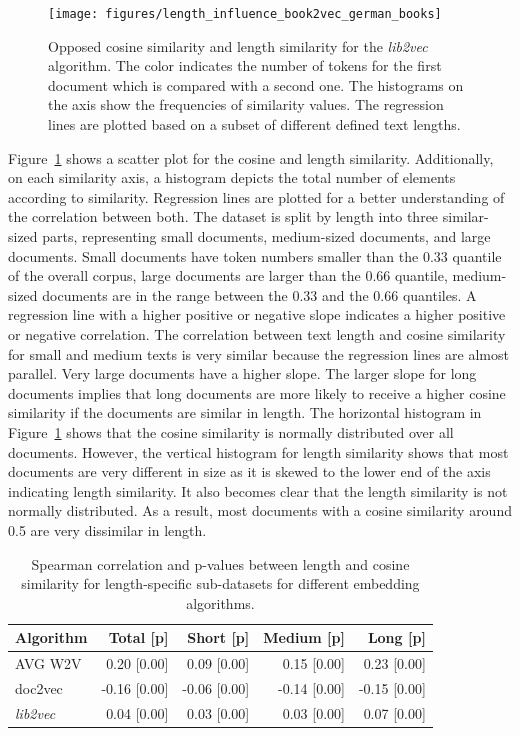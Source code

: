 \documentclass[11pt]{article}
\begin{document}
\begin{figure}
	\centering
	\texttt{[image: figures/length\_influence\_book2vec\_german\_books]}
	\caption{Opposed cosine similarity and length similarity for the \emph{lib2vec} algorithm.
		The color indicates the number of tokens for the first document which is compared with a second one.
		The histograms on the axis show the frequencies of similarity values. 
		The regression lines are plotted based on a subset of different defined text lengths.}
	\label{fig:length_influence_b2v}
\end{figure}

Figure~\ref{fig:length_influence_b2v} shows a scatter plot for the cosine and length similarity.
Additionally, on each similarity axis, a histogram depicts the total number of elements according to similarity.
Regression lines are plotted for a better understanding of the correlation between both.
The dataset is split by length into three similar-sized parts, representing small documents, medium-sized documents, and large documents.
Small documents have token numbers smaller than the 0.33 quantile of the overall corpus, large documents are larger than the 0.66 quantile, medium-sized documents are in the range between the 0.33 and the 0.66 quantiles.
A regression line with a higher positive or negative slope indicates a higher positive or negative correlation.
The correlation between text length and cosine similarity for small and medium texts is very similar because the regression lines are almost parallel.
Very large documents have a higher slope.
The larger slope for long documents implies that long documents are more likely to receive a higher cosine similarity if the documents are similar in length.
The horizontal histogram in Figure~\ref{fig:length_influence_b2v} shows that the cosine similarity is normally distributed over all documents.
However, the vertical histogram for length similarity shows that most documents are very different in size as it is skewed to the lower end of the axis indicating length similarity.
It also becomes clear that the length similarity is not normally distributed.
As a result, most documents with a cosine similarity around 0.5 are very dissimilar in length.

\begin{table}[ht]
	\centering
	\begin{tabular}{lrrrr}
		\toprule
		Algorithm & Total [p] & Short [p] & Medium [p] & Long [p] \\
		\midrule
		AVG W2V &   0.20 [0.00] &    0.09 [0.00] &     0.15 [0.00] &   0.23 [0.00] \\
		doc2vec &  -0.16 [0.00] &   -0.06 [0.00] &    -0.14 [0.00] &  -0.15 [0.00] \\
		\emph{lib2vec} &   0.04 [0.00] &    0.03 [0.00] &     0.03 [0.00] &   0.07 [0.00] \\
		\bottomrule
	\end{tabular}
	\caption[Spearman Correlation between Length and Cosine Similarity]{Spearman correlation and p-values between length and cosine similarity for length-specific sub-datasets for different embedding algorithms.}
	\label{tab:text_length_correlation}
\end{table}
\end{document}
